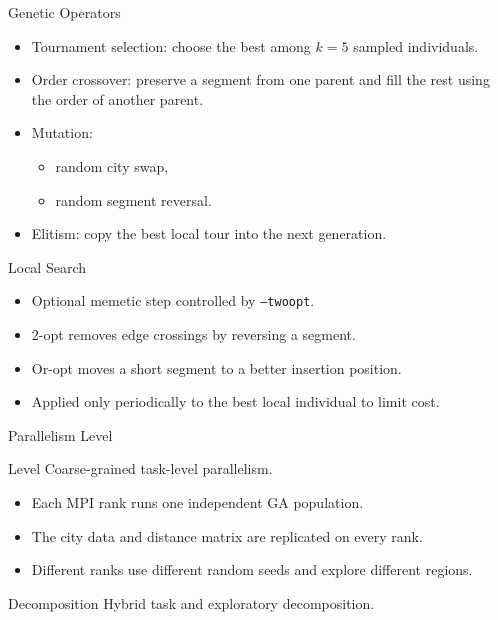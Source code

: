 \documentclass[aspectratio=169]{beamer}
\begin{document}
\begin{frame}{Genetic Operators}
  \begin{itemize}
    \item Tournament selection: choose the best among $k=5$ sampled individuals.
    \item Order crossover: preserve a segment from one parent and fill the rest using the order of another parent.
    \item Mutation:
      \begin{itemize}
        \item random city swap,
        \item random segment reversal.
      \end{itemize}
    \item Elitism: copy the best local tour into the next generation.
  \end{itemize}
\end{frame}

\begin{frame}{Local Search}
  \begin{itemize}
    \item Optional memetic step controlled by \texttt{--twoopt}.
    \item 2-opt removes edge crossings by reversing a segment.
    \item Or-opt moves a short segment to a better insertion position.
    \item Applied only periodically to the best local individual to limit cost.
  \end{itemize}
\end{frame}

\begin{frame}{Parallelism Level}
  \begin{block}{Level}
    Coarse-grained task-level parallelism.
  \end{block}
  \begin{itemize}
    \item Each MPI rank runs one independent GA population.
    \item The city data and distance matrix are replicated on every rank.
    \item Different ranks use different random seeds and explore different regions.
  \end{itemize}
  \begin{block}{Decomposition}
    Hybrid task and exploratory decomposition.
  \end{block}
\end{frame}
\end{document}
